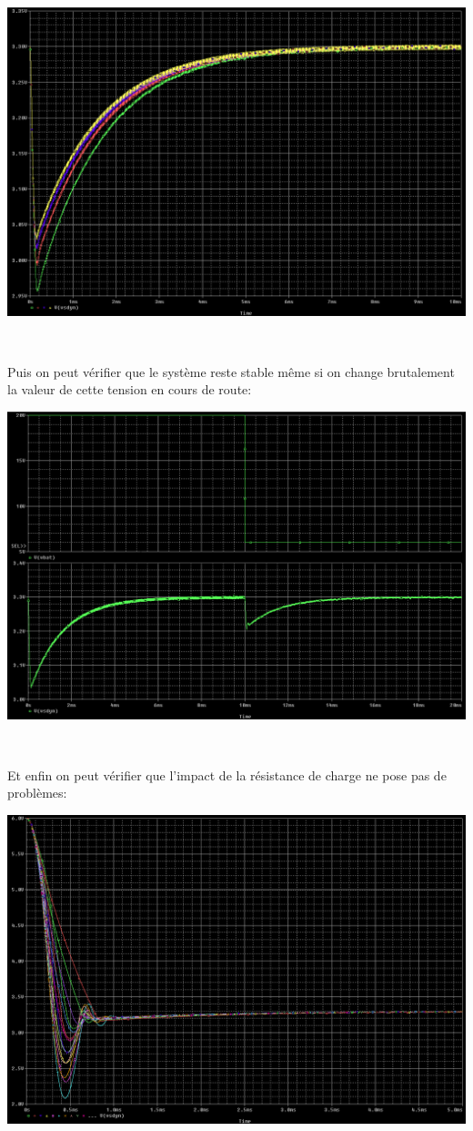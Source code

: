 \documentclass{article}
\begin{document}
\includegraphics[width=\linewidth]{demarage_temporelle.png}

~

\newpage
Puis on peut vérifier que le système reste stable même si on change brutalement la valeur de cette tension en cours de route:

\includegraphics[width=\linewidth]{grand_coup_dans_la_batterie.png}

~

Et enfin on peut vérifier que l’impact de la résistance de charge ne pose pas de problèmes:

\includegraphics[width=\linewidth]{simu_temporelle_param_Rch.png}
\end{document}

